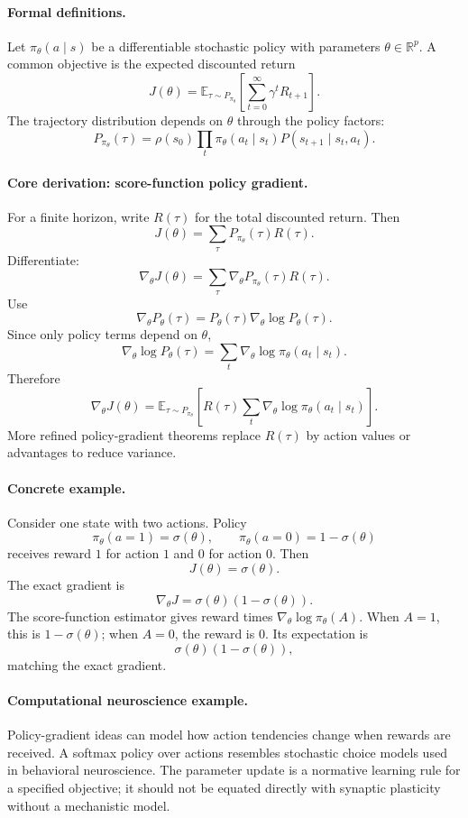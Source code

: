 \paragraph{Formal definitions.}
Let \(\pi_\theta(a\mid s)\) be a differentiable stochastic policy with parameters \(\theta\in\mathbb R^p\). A common objective is the expected discounted return
\[
\boxed{
J(\theta)=\mathbb E_{\tau\sim P_{\pi_\theta}}\left[\sum_{t=0}^\infty\gamma^t R_{t+1}\right].
}
\]
The trajectory distribution depends on \(\theta\) through the policy factors:
\[
P_{\pi_\theta}(\tau)=\rho(s_0)\prod_t\pi_\theta(a_t\mid s_t)P(s_{t+1}\mid s_t,a_t).
\]

\paragraph{Core derivation: score-function policy gradient.}
For a finite horizon, write \(R(\tau)\) for the total discounted return. Then
\[
J(\theta)=\sum_\tau P_{\pi_\theta}(\tau)R(\tau).
\]
Differentiate:
\[
\nabla_\theta J(\theta)
=\sum_\tau \nabla_\theta P_{\pi_\theta}(\tau)R(\tau).
\]
Use
\[
\nabla_\theta P_\theta(\tau)
=P_\theta(\tau)\nabla_\theta\log P_\theta(\tau).
\]
Since only policy terms depend on \(\theta\),
\[
\nabla_\theta\log P_\theta(\tau)
=\sum_t\nabla_\theta\log\pi_\theta(a_t\mid s_t).
\]
Therefore
\[
\boxed{
\nabla_\theta J(\theta)
=\mathbb E_{\tau\sim P_{\pi_\theta}}
\left[
R(\tau)\sum_t\nabla_\theta\log\pi_\theta(a_t\mid s_t)
\right].
}
\]
More refined policy-gradient theorems replace \(R(\tau)\) by action values or advantages to reduce variance.

\paragraph{Concrete example.}
Consider one state with two actions. Policy
\[
\pi_\theta(a=1)=\sigma(\theta),\qquad \pi_\theta(a=0)=1-\sigma(\theta)
\]
receives reward \(1\) for action \(1\) and \(0\) for action \(0\). Then
\[
J(\theta)=\sigma(\theta).
\]
The exact gradient is
\[
\nabla_\theta J=\sigma(\theta)(1-\sigma(\theta)).
\]
The score-function estimator gives reward times \(\nabla_\theta\log\pi_\theta(A)\). When \(A=1\), this is \(1-\sigma(\theta)\); when \(A=0\), the reward is \(0\). Its expectation is
\[
\sigma(\theta)(1-\sigma(\theta)),
\]
matching the exact gradient.

\paragraph{Computational neuroscience example.}
Policy-gradient ideas can model how action tendencies change when rewards are received. A softmax policy over actions resembles stochastic choice models used in behavioral neuroscience. The parameter update is a normative learning rule for a specified objective; it should not be equated directly with synaptic plasticity without a mechanistic model.

